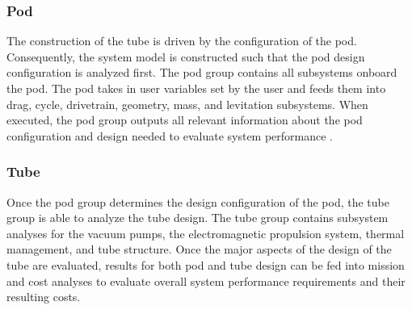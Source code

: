 \subsubsection{Pod}
	The construction of the tube is driven by the configuration of the pod. Consequently, the system model is constructed such that the pod design configuration is analyzed first. The pod group contains all subsystems onboard the pod. The pod takes in user variables set by the user and feeds them into drag, cycle, drivetrain, geometry, mass, and levitation subsystems. When executed, the pod group outputs all relevant information about the pod configuration and design needed to evaluate system performance .
\subsubsection{Tube}
	Once the pod group determines the design configuration of the pod, the tube group is able to analyze the tube design. The tube group contains subsystem analyses for the vacuum pumps, the electromagnetic propulsion system, thermal management, and tube structure. Once the major aspects of the design of the tube are evaluated, results for both pod and tube design can be fed into mission and cost analyses to evaluate overall system performance requirements and their resulting costs.

